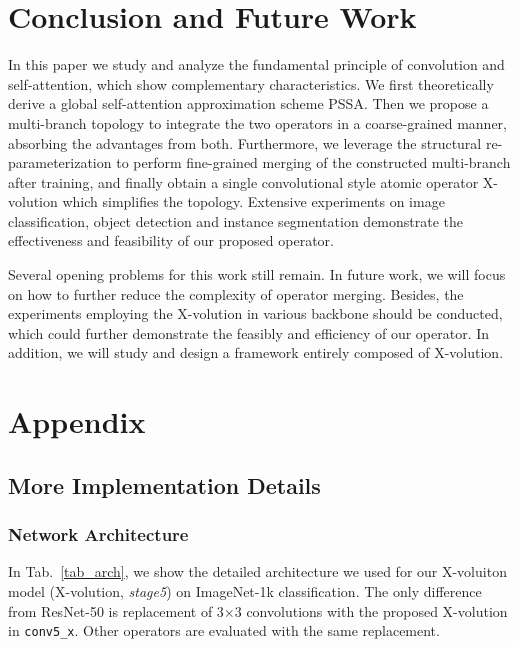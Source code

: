 \documentclass{article}
\begin{document}
\vspace{2mm}
\section{Conclusion and Future Work}
\label{sec_5}
In this paper we study and analyze the fundamental principle of convolution and self-attention, which show complementary characteristics.
We first theoretically derive a global self-attention approximation scheme PSSA. 
Then we propose a multi-branch topology to integrate the two operators in a coarse-grained manner, absorbing the advantages from both.
Furthermore, we leverage the structural re-parameterization to perform fine-grained merging of the constructed multi-branch after training, and finally obtain a single convolutional style atomic operator X-volution which simplifies the topology.
Extensive experiments on image classification, object detection and instance segmentation demonstrate the effectiveness and feasibility of our proposed operator.

Several opening problems for this work still remain.
In future work, we will focus on how to further reduce the complexity of operator merging.
Besides, the experiments employing the X-volution in various backbone should be conducted, which could further demonstrate the feasibly and efficiency of our operator.
In addition, we will study and design a framework entirely composed of X-volution.






\clearpage
\section{Appendix}
\subsection{More Implementation Details} 
\label{supp_sec1}
\subsubsection{Network Architecture}
In Tab.~\ref{tab_arch}, we show the detailed architecture we used for our X-voluiton model (X-volution, \textit{stage5}) on ImageNet-1k classification. The only difference from ResNet-50 is replacement of 3$\times$3 convolutions with the proposed X-volution in \texttt{conv5\_x}. Other operators are evaluated with the same replacement.

\newcommand{\blockb}[3]{\multirow{3}{*}{
\(\left[
\begin{array}{l}
\text{1$\times$1, #2}\\
[-.2em] \text{3$\times$3, #2}\\
[-.2em] \text{1$\times$1, #1}
\end{array}\right]\)$\times$#3}
}
\end{document}
